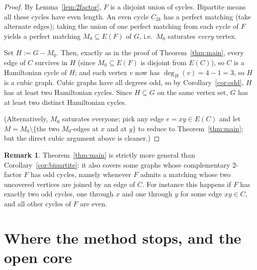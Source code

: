 \documentclass{amsart}
\theoremstyle{plain}
\theoremstyle{definition}
\newtheorem{remark}{Remark}
\begin{document}
\begin{proof}
By Lemma~\ref{lem:2factor}, $F$ is a disjoint union of cycles.  Bipartite means
all these cycles have even length.  An even cycle $C_{2k}$ has a perfect matching
(take alternate edges); taking the union of one perfect matching from each cycle
of $F$ yields a perfect matching $M_0\subseteq E(F)$ of $G$, i.e.\ $M_0$ saturates
\emph{every} vertex.

Set $H:=G-M_0$.  Then, exactly as in the proof of Theorem~\ref{thm:main}, every
edge of $C$ survives in $H$ (since $M_0\subseteq E(F)$ is disjoint from $E(C)$),
so $C$ is a Hamiltonian cycle of $H$; and each vertex $v$ now has
$\deg_H(v)=4-1=3$, so $H$ is a cubic graph.  Cubic graphs have all degrees odd,
so by Corollary~\ref{cor:odd}, $H$ has at least two Hamiltonian cycles.  Since
$H\subseteq G$ on the same vertex set, $G$ has at least two distinct Hamiltonian
cycles.

(Alternatively, $M_0$ saturates everyone; pick any edge $e=xy\in E(C)$ and let
$M=M_0\setminus\{$the two $M_0$-edges at $x$ and at $y\}$ to reduce to
Theorem~\ref{thm:main}; but the direct cubic argument above is cleaner.)
\end{proof}

\begin{remark}
Theorem~\ref{thm:main} is strictly more general than
Corollary~\ref{cor:bipartite}: it also covers some graphs whose complementary
$2$-factor $F$ has odd cycles, namely whenever $F$ admits a matching whose two
uncovered vertices are joined by an edge of $C$.  For instance this happens if
$F$ has exactly two odd cycles, one through $x$ and one through $y$ for some edge
$xy\in C$, and all other cycles of $F$ are even.
\end{remark}

\section{Where the method stops, and the open core}
\end{document}
